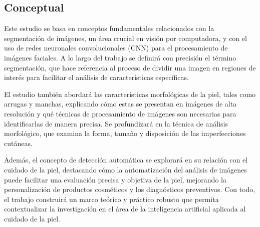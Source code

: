 \subsection{Conceptual}

Este estudio se basa en conceptos fundamentales relacionados con la segmentación de imágenes, un área crucial en visión por computadora, y con el uso de redes neuronales convolucionales (CNN) para el procesamiento de imágenes faciales. A lo largo del trabajo se definirá con precisión el término segmentación, que hace referencia al proceso de dividir una imagen en regiones de interés para facilitar el análisis de características específicas.

El estudio también abordará las características morfológicas de la piel, tales como arrugas y manchas, explicando cómo estas se presentan en imágenes de alta resolución y qué técnicas de procesamiento de imágenes son necesarias para identificarlas de manera precisa. Se profundizará en la técnica de análisis morfológico, que examina la forma, tamaño y disposición de las imperfecciones cutáneas.

Además, el concepto de detección automática se explorará en su relación con el cuidado de la piel, destacando cómo la automatización del análisis de imágenes puede facilitar una evaluación precisa y objetiva de la piel, mejorando la personalización de productos cosméticos y los diagnósticos preventivos. Con todo, el trabajo construirá un marco teórico y práctico robusto que permita contextualizar la investigación en el área de la inteligencia artificial aplicada al cuidado de la piel.